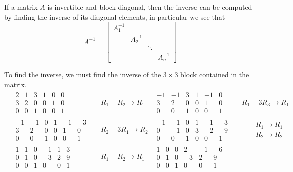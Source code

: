 \documentclass{report}
\begin{document}
\begin{note}
If a matrix $A$ is invertible and block diagonal,  then the inverse can be computed by finding the inverse of its diagonal elements,  in particular we see that
$$
A^{-1} =
\begin{bmatrix}
A_1^{-1} & & & \\
& A_2^{-1} & & \\
& & \ddots & \\
& & & A_n^{-1}
\end{bmatrix}
$$
\end{note}
To find the inverse,  we must find the inverse of the $3\times3$ block contained in the matrix.
\begin{align*}
&\begin{array}{ccc|ccc}
2&1&3&1&0&0\\
3&2&0&0&1&0\\
0&0&1&0&0&1
\end{array}
&& R_1 - R_2 \rightarrow R_1
&\begin{array}{ccc|ccc}
-1&-1&3&1&-1&0\\
3&2&0&0&1&0\\
0&0&1&0&0&1
\end{array}
&& R_1 - 3R_3 \rightarrow R_1\\
&\begin{array}{ccc|ccc}
-1&-1&0&1&-1&-3\\
3&2&0&0&1&0\\
0&0&1&0&0&1
\end{array}
&& R_2 + 3R_1 \rightarrow R_2
&\begin{array}{ccc|ccc}
-1&-1&0&1&-1&-3\\
0&-1&0&3&-2&-9\\
0&0&1&0&0&1
\end{array}
&& \begin{aligned} &-R_1 \rightarrow R_1 \\ &-R_2 \rightarrow R_2 \end{aligned} \\
&\begin{array}{ccc|ccc}
1&1&0&-1&1&3\\
0&1&0&-3&2&9\\
0&0&1&0&0&1
\end{array}
&& R_1 - R_2 \rightarrow R_1
&\begin{array}{ccc|ccc}
1&0&0&2&-1&-6\\
0&1&0&-3&2&9\\
0&0&1&0&0&1
\end{array}
\end{align*}
\end{document}
